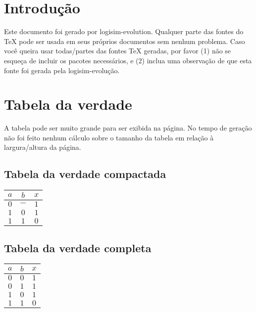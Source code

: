 \documentclass [15pt,a4paper,twoside]{article}
\begin{document}
\section{Introdução}
Este documento foi gerado por logisim-evolution. Qualquer parte das fontes do TeX pode ser usada em seus próprios documentos sem nenhum problema. Caso você queira usar todas/partes das fontes TeX geradas, por favor (1) não se esqueça de incluir os pacotes necessários, e (2) inclua uma observação de que esta fonte foi gerada pela logisim-evolução.
\section{Tabela da verdade}
A tabela pode ser muito grande para ser exibida na página. No tempo de geração não foi feito nenhum cálculo sobre o tamanho da tabela em relação à largura/altura da página.
\subsection{Tabela da verdade compactada}
\begin{center}
\begin{tabular}{cc|c}
$a$&$b$&$x$\\
\hline
$0$&$-$&$1$\\
$1$&$0$&$1$\\
$1$&$1$&$0$\\

\end{tabular}
\end{center}
\subsection{Tabela da verdade completa}
\begin{center}
\begin{tabular}{cc|c}
$a$&$b$&$x$\\
\hline
$0$&$0$&$1$\\
$0$&$1$&$1$\\
$1$&$0$&$1$\\
$1$&$1$&$0$\\

\end{tabular}
\end{center}
\end{document}

